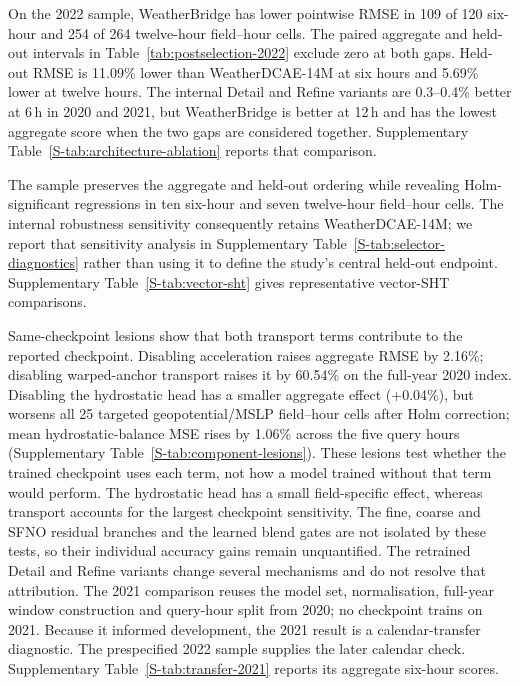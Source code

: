 \documentclass[referee,lineno,pdflatex,sn-nature]{sn-jnl}
\begin{document}
On the 2022 sample, WeatherBridge has lower pointwise RMSE in 109 of 120
six-hour and 254 of 264 twelve-hour field--hour cells. The paired aggregate
and held-out intervals in Table~\ref{tab:postselection-2022} exclude zero at
both gaps. Held-out RMSE is 11.09\% lower than WeatherDCAE-14M at six hours
and 5.69\% lower at twelve hours. The
internal Detail and Refine variants are 0.3--0.4\% better at 6\,h in 2020 and
2021, but WeatherBridge is better at 12\,h and has the lowest aggregate score
when the two gaps are considered together. Supplementary
Table~\ref{S-tab:architecture-ablation} reports that comparison.

The sample preserves the aggregate and held-out ordering while revealing
Holm-significant regressions in ten six-hour and seven twelve-hour field--hour
cells. The internal robustness sensitivity consequently retains
WeatherDCAE-14M; we report
that sensitivity analysis in Supplementary Table~\ref{S-tab:selector-diagnostics}
rather than using it to define the study's central held-out endpoint.
Supplementary Table~\ref{S-tab:vector-sht} gives representative vector-SHT
comparisons.

Same-checkpoint lesions show that both transport terms contribute to the
reported checkpoint. Disabling acceleration raises aggregate RMSE by 2.16\%;
disabling warped-anchor transport raises it by 60.54\% on the full-year 2020
index. Disabling the hydrostatic head has a smaller aggregate effect
(+0.04\%), but worsens all 25 targeted geopotential/MSLP field--hour cells
after Holm correction; mean hydrostatic-balance MSE rises by 1.06\% across the
five query hours (Supplementary Table~\ref{S-tab:component-lesions}). These
lesions test whether the trained checkpoint uses each term, not how a
model trained without that term would perform. The hydrostatic head has
a small field-specific effect, whereas transport accounts for the largest
checkpoint sensitivity. The fine, coarse and SFNO residual branches and
the learned blend gates are not isolated by these tests, so their individual
accuracy gains remain unquantified. The retrained Detail and Refine
variants change several mechanisms and do not resolve that attribution.
The 2021 comparison reuses the model set, normalisation, full-year window
construction and query-hour split from 2020; no checkpoint trains on 2021.
Because it informed development, the 2021 result is a calendar-transfer
diagnostic. The prespecified 2022 sample supplies the later calendar check. Supplementary
Table~\ref{S-tab:transfer-2021} reports its aggregate six-hour scores.
\end{document}
